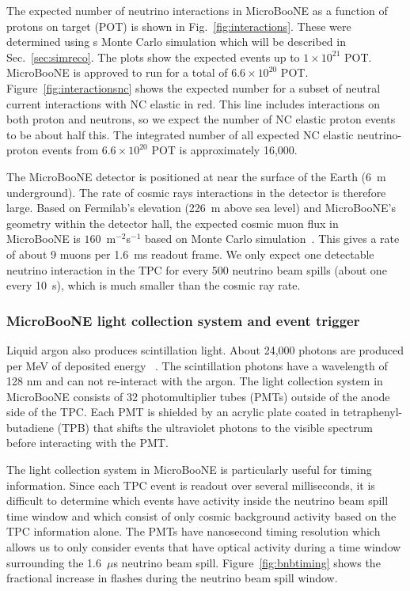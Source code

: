     The expected number of neutrino interactions in MicroBooNE as a function of
    protons on target (POT) is shown in Fig.~\ref{fig:interactions}. These were
    determined using s Monte Carlo simulation which will be described in
    Sec.~\ref{sec:simreco}. The plots show the expected events up to $1\times
    10^{21}$ POT. MicroBooNE is approved to run for a total of $6.6\times
    10^{20}$ POT. Figure~\ref{fig:interactionsnc} shows the expected number for
    a subset of neutral current interactions with NC elastic in red. This line
    includes interactions on both proton and neutrons, so we expect the number
    of NC elastic proton events to be about half this. The integrated number of
    all expected NC elastic neutrino-proton events from $6.6\times 10^{20}$ POT
    is approximately 16,000.

    The MicroBooNE detector is positioned at near the surface of the Earth (6~m
    underground). The rate of cosmic rays interactions in the detector is
    therefore large. Based on Fermilab's elevation (226~m above sea level) and
    MicroBooNE's geometry within the detector hall, the expected cosmic muon
    flux in MicroBooNE is $160$~m$^{-2}$s$^{-1}$ based on Monte Carlo
    simulation~\cite{cosmicnote}. This gives a rate of about 9 muons per 1.6~ms
    readout frame. We only expect one detectable neutrino interaction in the
    TPC for every 500 neutrino beam spills (about one every 10~s), which is
    much smaller than the cosmic ray rate.

  \subsubsection{MicroBooNE light collection system and event trigger}\label{sec:swtrigger}
    Liquid argon also produces scintillation light. About 24,000 photons are
    produced per MeV of deposited energy ~\cite{detectorpaper}. The
    scintillation photons have a wavelength of 128 nm and can not re-interact
    with the argon. The light collection system in MicroBooNE consists of
    32 photomultiplier tubes (PMTs) outside of the anode side of the
    TPC. Each PMT is shielded by an acrylic plate coated in
    tetraphenyl-butadiene (TPB) that shifts the ultraviolet photons to the
    visible spectrum before interacting with the PMT.

    The light collection system in MicroBooNE is particularly useful for timing
    information. Since each TPC event is readout over several milliseconds, it
    is difficult to determine which events have activity inside the neutrino
    beam spill time window and which consist of only cosmic background activity
    based on the TPC information alone. The PMTs have nanosecond timing
    resolution which allows us to only consider events that have optical
    activity during a time window surrounding the 1.6~$\mu$s neutrino beam
    spill. Figure~\ref{fig:bnbtiming} shows the fractional increase in flashes
    during the neutrino beam spill window.

